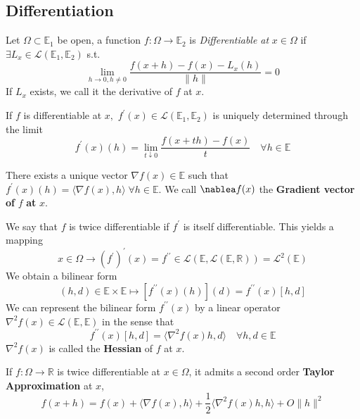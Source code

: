 \documentclass{tufte-handout}
\begin{document}
\subsection{Differentiation}%
  \label{sub:Differentiation}
  \begin{definition}[Differentiable]
    Let $\Omega \subset \mathbb{E}_1$ be open, a function $f: \Omega\to \mathbb{E}_2$ is \textit{Differentiable at} $x \in \Omega$ if $\exists L_x \in \mathcal{L}(\mathbb{E}_1, \mathbb{E}_2 )$ s.t.
    $$\lim_{h \to 0, h \neq 0} \frac{f(x+h) - f(x) - L_x(h)}{\| h \|}  = 0
    $$
    If $L_x$ exists, we call it the derivative of $f$ at $x.$
  \end{definition}
  \begin{remark} 
    If $f$ is differentiable at $x ,$ $f^\prime (x) \in\mathcal{L}(\mathbb{E}_1, \mathbb{E}_2 ) $ is uniquely determined through the limit 
    $$f^\prime (x)(h) = \lim_{t\downarrow 0} \frac{f(x+ th) - f(x)}{t} \quad \forall h\in \mathbb{E} $$
  \end{remark}
  \begin{remark} 
    There exists a unique vector $\nabla f(x) \in \mathbb{E}$ such that $f^\prime (x)(h) = \langle \nabla f(x) , h \rangle \; \forall h \in \mathbb{E}$. We call $\nablea f(x)$ the \textbf{Gradient vector of} $f$ \textbf{at} $x.$ 
  \end{remark}
  \begin{definition}[Hessian]
    We say that $f$ is twice differentiable if $f^\prime $ is itself differentiable. This yields a mapping 
    $$x \in \Omega \to (f^\prime)^\prime (x) = f^{\prime \prime} \in \mathcal{L}(\mathbb{E}, \mathcal{L}(\mathbb{E}, \mathbb{R}))  = \mathcal{L}^2 (\mathbb{E}) $$ 
    We obtain a bilinear form 
    $$(h,d) \in \mathbb{E} \times \mathbb{E} \mapsto [f^{\prime \prime }(x) (h)](d) = f^{\prime \prime }(x)[h,d] $$
    We can represent the bilinear form $f^{\prime \prime}(x)$ by a linear operator $\nabla^2 f(x) \in \mathcal{L}(\mathbb{E}, \mathbb{E})$ in the sense that  
    $$f^{\prime \prime} (x) [h, d]= \langle \nabla^2 f(x)h, d \rangle \quad \forall h,d \in \mathbb{E} $$
    $\nabla ^2 f(x)$ is called the \textbf{Hessian} of $f$ at $x.$
  \end{definition}
  \begin{proposition} \label{label}
    If $f: \Omega \to \mathbb{R}$ is twice differentiable at $x \in \Omega$, it admits a second order \textbf{Taylor Approximation} at $x$, 
    $$f(x+h) = f(x) + \langle \nabla f(x) , h\rangle + \frac{1}{2} \langle \nabla^2 f(x) h, h\rangle + O\| h\|^2 $$
  \end{proposition}
\end{document}
